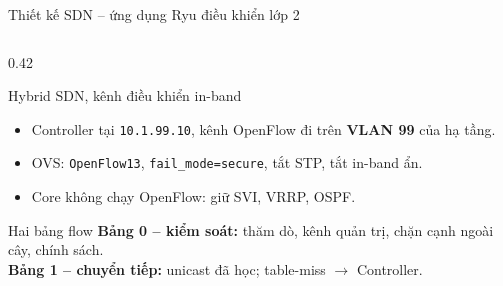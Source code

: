 \documentclass[aspectratio=169, 10pt, xcolor={table}]{beamer}
\newcommand{\compactlist}{\setlength{\itemsep}{1pt}\setlength{\parskip}{0pt}}
\begin{document}
\begin{frame}{Thiết kế SDN -- ứng dụng Ryu điều khiển lớp 2}
\begin{columns}[T]
\begin{column}{0.42\textwidth}
\begin{card}[accent]{Hybrid SDN, kênh điều khiển in-band}
                \scriptsize
                \begin{itemize}\compactlist
                    \item Controller tại \texttt{10.1.99.10}, kênh OpenFlow đi trên \textbf{VLAN 99} của hạ tầng.
                    \item OVS: \texttt{OpenFlow13}, \texttt{fail\_mode=secure}, tắt STP, tắt in-band ẩn.
                    \item Core không chạy OpenFlow: giữ SVI, VRRP, OSPF.
                \end{itemize}
            \end{card}
            \begin{card}[okGreen]{Hai bảng flow}
                \scriptsize
                \textbf{Bảng 0 -- kiểm soát:} thăm dò, kênh quản trị, chặn cạnh ngoài cây, chính sách.\\
                \textbf{Bảng 1 -- chuyển tiếp:} unicast đã học; table-miss $\rightarrow$ Controller.
            \end{card}
        \end{column}
    \end{columns}
\end{frame}
\end{document}
